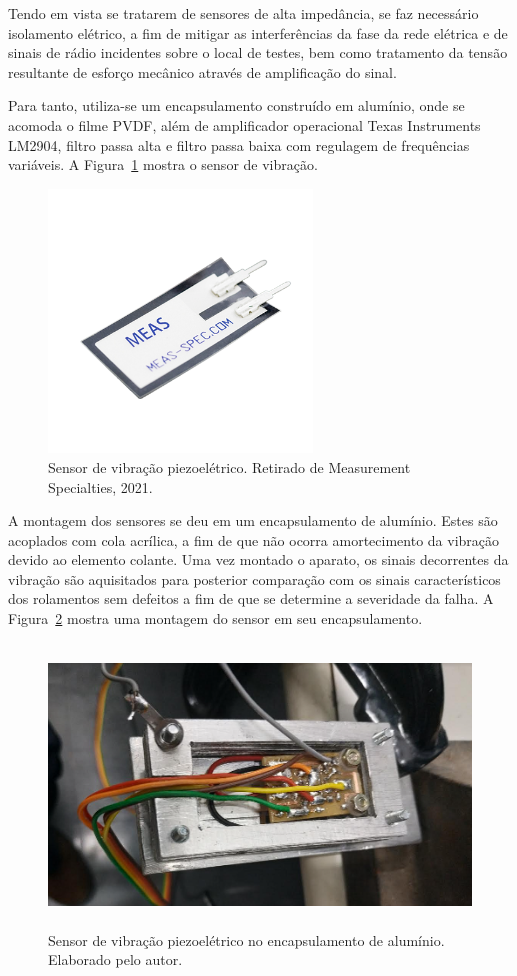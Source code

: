 \documentclass[
	12pt,				
	oneside,			
	a4paper,			
	english,			
	brazil,			
	]{abntex2ppgsi}
\begin{document}
Tendo em vista se tratarem de sensores de alta impedância, se faz necessário isolamento elétrico, a fim de mitigar as interferências da fase da rede elétrica e de sinais de rádio incidentes sobre o local de testes, bem como tratamento da tensão resultante de esforço mecânico através de amplificação do sinal. 

Para tanto, utiliza-se um encapsulamento construído em alumínio, onde se acomoda o filme PVDF, além de amplificador operacional Texas Instruments LM2904, filtro passa alta e filtro passa baixa com regulagem de frequências variáveis. A Figura~\ref{Figura21} mostra o sensor de vibração. 

\begin{figure}[H]
\centering
\includegraphics[width=\textwidth,height=70mm,keepaspectratio]{Figura21}
\caption {Sensor de vibração piezoelétrico. Retirado de Measurement Specialties, 2021.}
\label{Figura21}
\end{figure} 

A montagem dos sensores se deu em um encapsulamento de alumínio. Estes são acoplados com cola acrílica, a fim de que não ocorra amortecimento da vibração devido ao elemento colante. Uma vez montado o aparato, os sinais decorrentes da vibração são aquisitados para posterior comparação com os sinais característicos dos rolamentos sem defeitos a fim de que se determine a severidade da falha. A Figura~\ref{encapsulamento_sensor} mostra uma montagem do sensor em seu encapsulamento.

\begin{figure}[H]
\centering
\includegraphics[width=\textwidth,height=75mm,keepaspectratio]{encapsulamento_sensor}
\caption {Sensor de vibração piezoelétrico no encapsulamento de alumínio. Elaborado pelo autor.}
\label{encapsulamento_sensor}
\end{figure} 
\end{document}
